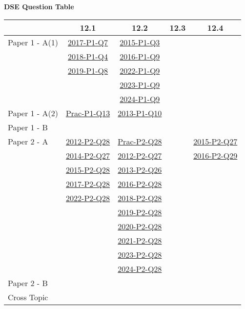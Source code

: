 \documentclass[12pt, a4paper]{article}
\begin{document}
\begin{absolutelynopagebreak}
\begin{center}
\textbf{DSE Question Table}
\end{center}
\begin{center}
\begin{tabular}{|l|c|c|c|c|}
\hline
        & 12.1 & 12.2 & 12.3 & 12.4 \\\hline
\hline
Paper 1 - A(1)& \hyperref[DSE2017-CoreP1-Q07]{2017-P1-Q7} & \hyperref[DSE2015-CoreP1-Q03]{2015-P1-Q3} &  &  \\
& \hyperref[DSE2018-CoreP1-Q04]{2018-P1-Q4} & \hyperref[DSE2016-CoreP1-Q09]{2016-P1-Q9} &  &  \\
& \hyperref[DSE2019-CoreP1-Q08]{2019-P1-Q8} & \hyperref[DSE2022-CoreP1-Q09]{2022-P1-Q9} &  &  \\
&  & \hyperref[DSE2023-CoreP1-Q09]{2023-P1-Q9} &  &  \\
&  & \hyperref[DSE2024-CoreP1-Q09]{2024-P1-Q9} &  &  \\
\hline
Paper 1 - A(2)& \hyperref[DSE2012P-CoreP1-Q13]{Prac-P1-Q13} & \hyperref[DSE2013-CoreP1-Q10]{2013-P1-Q10} &  &  \\
\hline
Paper 1 - B&  &  &  &  \\
\hline
\hline
Paper 2 - A& \hyperref[DSE2012-CoreP2-Q28]{2012-P2-Q28} & \hyperref[DSE2012P-CoreP2-Q28]{Prac-P2-Q28} &  & \hyperref[DSE2015-CoreP2-Q27]{2015-P2-Q27} \\
& \hyperref[DSE2014-CoreP2-Q27]{2014-P2-Q27} & \hyperref[DSE2012-CoreP2-Q27]{2012-P2-Q27} &  & \hyperref[DSE2016-CoreP2-Q29]{2016-P2-Q29} \\
& \hyperref[DSE2015-CoreP2-Q28]{2015-P2-Q28} & \hyperref[DSE2013-CoreP2-Q26]{2013-P2-Q26} &  &  \\
& \hyperref[DSE2017-CoreP2-Q28]{2017-P2-Q28} & \hyperref[DSE2016-CoreP2-Q28]{2016-P2-Q28} &  &  \\
& \hyperref[DSE2022-CoreP2-Q28]{2022-P2-Q28} & \hyperref[DSE2018-CoreP2-Q28]{2018-P2-Q28} &  &  \\
&  & \hyperref[DSE2019-CoreP2-Q28]{2019-P2-Q28} &  &  \\
&  & \hyperref[DSE2020-CoreP2-Q28]{2020-P2-Q28} &  &  \\
&  & \hyperref[DSE2021-CoreP2-Q28]{2021-P2-Q28} &  &  \\
&  & \hyperref[DSE2023-CoreP2-Q28]{2023-P2-Q28} &  &  \\
&  & \hyperref[DSE2024-CoreP2-Q28]{2024-P2-Q28} &  &  \\
\hline
Paper 2 - B&  &  &  &  \\
\hline
\hline
Cross Topic&  &  &  &  \\
\hline
\end{tabular}
\end{center}
\end{absolutelynopagebreak}
\end{document}
